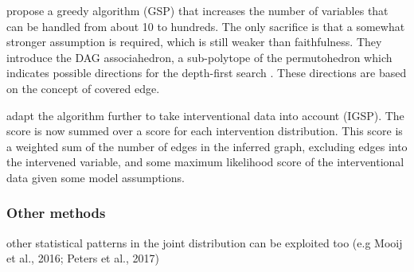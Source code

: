 \citet{solus2017consistency} propose a greedy algorithm (GSP) that increases the number of variables that can be handled from about 10 to hundreds. The only sacrifice is that a somewhat stronger assumption is required, which is still weaker than faithfulness. They introduce the DAG associahedron, a sub-polytope of the permutohedron which indicates possible directions for the depth-first search . These directions are based on the concept of covered edge. 

\citet{wang2017permutation} adapt the algorithm further to take interventional data into account (IGSP). The score is now summed over a score for each intervention distribution. This score is a weighted sum of the number of edges in the inferred graph, excluding edges into the intervened variable, and some maximum likelihood score of the interventional data given some model assumptions.





\subsubsection{Other methods}
other statistical patterns in the joint distribution can be exploited too (e.g Mooij et al., 2016; Peters et al., 2017)




